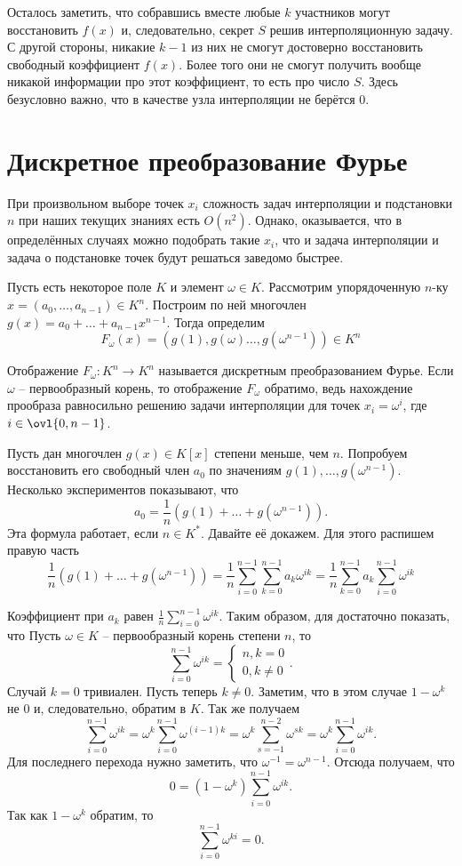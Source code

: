 Осталось заметить, что собравшись вместе любые $k$ участников могут восстановить  $f(x)$
и, следовательно, секрет $S$ решив интерполяционную задачу. С другой стороны, никакие $k-1$ из них не смогут достоверно восстановить свободный коэффициент $f(x)$. Более того они не смогут получить вообще никакой информации про этот коэффициент, то есть про число $S$. Здесь безусловно важно, что в качестве узла интерполяции не берётся 0.


\section{Дискретное преобразование Фурье}

При произвольном выборе точек $x_i$ сложность задач интерполяции и подстановки $n$ при наших текущих знаниях есть $O(n^2)$. Однако, оказывается, что в определённых случаях можно подобрать такие $x_i$, что и задача интерполяции и задача о подстановке точек будут решаться заведомо быстрее.

Пусть есть некоторое поле $K$ и элемент $\omega \in K$. Рассмотрим упорядоченную $n$-ку $x=(a_0,\dots,a_{n-1})\in K^n$. Построим по ней многочлен $g(x)=a_0+\dots+a_{n-1}x^{n-1}$. Тогда определим $$F_{\omega}(x)=(g(1), g(\omega)\dots,g(\omega^{n-1}))\in K^n$$


Отображение $F_{\omega}\colon K^n \to K^n$ называется дискретным преобразованием Фурье. Если $\omega$ -- первообразный корень, то отображение $F_{\omega}$ обратимо, ведь нахождение прообраза равносильно решению задачи интерполяции для точек $x_i=\omega^i$, где $i\in \ovl{0,n-1}$. 

Пусть дан многочлен $g(x) \in K[x]$ степени меньше, чем $n$. Попробуем восстановить его свободный член $a_0$ по значениям $g(1),\dots,g(\omega^{n-1})$. Несколько экспериментов показывают, что 
$$a_0=\frac{1}{n}\left(g(1)+\dots+g(\omega^{n-1})\right).$$
Эта формула работает, если $n \in K^*$. Давайте её докажем. Для этого распишем правую часть
$$\frac{1}{n}\left(g(1)+\dots+g(\omega^{n-1})\right)=\frac{1}{n}\sum_{i=0}^{n-1} \sum_{k=0}^{n-1} a_k \omega^{ik}=\frac{1}{n}\sum_{k=0}^{n-1} a_k\sum_{i=0}^{n-1} \omega^{ik}$$

Коэффициент при $a_k$ равен $\frac{1}{n} \sum_{i=0}^{n-1}\omega^{ik}$. Таким образом, для  достаточно показать, что
\lm Пусть $\omega \in K$ -- первообразный корень степени $n$, то $$\sum_{i=0}^{n-1}\omega^{ik}=\begin{cases} n, k=0\\
0, k\neq 0
\end{cases}.$$
\elm
\proof Случай $k=0$ тривиален. Пусть теперь $k\neq 0$. Заметим, что в этом случае $1-\omega^{k}$ не $0$ и, следовательно, обратим в $K$. Так же получаем
$$\sum_{i=0}^{n-1}\omega^{ik}=\omega^{k}\sum_{i=0}^{n-1} \omega^{(i-1)k}=\omega^{k}\sum_{s=-1}^{n-2} \omega^{sk}=\omega^{k}\sum_{i=0}^{n-1} \omega^{ik}.$$
Для последнего перехода нужно заметить, что $\omega^{-1}=\omega^{n-1}$. Отсюда получаем, что 
$$0=(1-\omega^k)\sum_{i=0}^{n-1} \omega^{ik}.$$
Так как $1-\omega^k$ обратим, то  $$\sum_{i=0}^{n-1}\omega^{ki}=0.$$
\endproof

